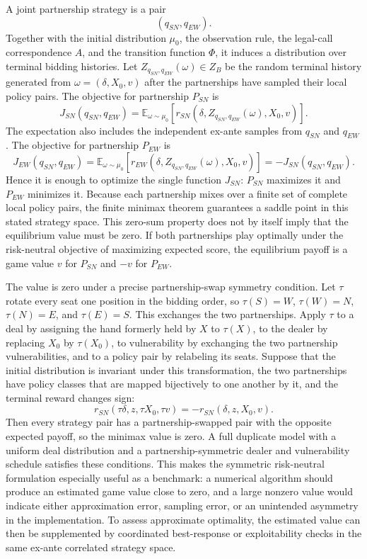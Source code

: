 \documentclass[11pt]{article}
\begin{document}
A joint partnership strategy is a pair
\[
    (q_{SN},q_{EW}).
\]
Together with the initial distribution $\mu_0$, the observation rule, the legal-call correspondence $A$, and the transition function $\Phi$, it induces a distribution over terminal bidding histories. Let $Z_{q_{SN},q_{EW}}(\omega)\in Z_B$ be the random terminal history generated from $\omega=(\delta,X_0,v)$ after the partnerships have sampled their local policy pairs. The objective for partnership $P_{SN}$ is
\[
    J_{SN}(q_{SN},q_{EW})
    =
    \mathbb{E}_{\omega\sim\mu_0}\left[
        r_{SN}(\delta,Z_{q_{SN},q_{EW}}(\omega),X_0,v)
    \right].
\]
The expectation also includes the independent ex-ante samples from $q_{SN}$ and $q_{EW}$. The objective for partnership $P_{EW}$ is
\[
    J_{EW}(q_{SN},q_{EW})
    =
    \mathbb{E}_{\omega\sim\mu_0}\left[
        r_{EW}(\delta,Z_{q_{SN},q_{EW}}(\omega),X_0,v)
    \right]
    =
    -J_{SN}(q_{SN},q_{EW}).
\]
Hence it is enough to optimize the single function $J_{SN}$: $P_{SN}$ maximizes it and $P_{EW}$ minimizes it. Because each partnership mixes over a finite set of complete local policy pairs, the finite minimax theorem guarantees a saddle point in this stated strategy space. This zero-sum property does not by itself imply that the equilibrium value must be zero. If both partnerships play optimally under the risk-neutral objective of maximizing expected score, the equilibrium payoff is a game value $v$ for $P_{SN}$ and $-v$ for $P_{EW}$.

The value is zero under a precise partnership-swap symmetry condition. Let $\tau$ rotate every seat one position in the bidding order, so $\tau(S)=W$, $\tau(W)=N$, $\tau(N)=E$, and $\tau(E)=S$. This exchanges the two partnerships. Apply $\tau$ to a deal by assigning the hand formerly held by $X$ to $\tau(X)$, to the dealer by replacing $X_0$ by $\tau(X_0)$, to vulnerability by exchanging the two partnership vulnerabilities, and to a policy pair by relabeling its seats. Suppose that the initial distribution is invariant under this transformation, the two partnerships have policy classes that are mapped bijectively to one another by it, and the terminal reward changes sign:
\[
    r_{SN}(\tau\delta,z,\tau X_0,\tau v)
    =
    -r_{SN}(\delta,z,X_0,v).
\]
Then every strategy pair has a partnership-swapped pair with the opposite expected payoff, so the minimax value is zero. A full duplicate model with a uniform deal distribution and a partnership-symmetric dealer and vulnerability schedule satisfies these conditions. This makes the symmetric risk-neutral formulation especially useful as a benchmark: a numerical algorithm should produce an estimated game value close to zero, and a large nonzero value would indicate either approximation error, sampling error, or an unintended asymmetry in the implementation. To assess approximate optimality, the estimated value can then be supplemented by coordinated best-response or exploitability checks in the same ex-ante correlated strategy space.
\end{document}
